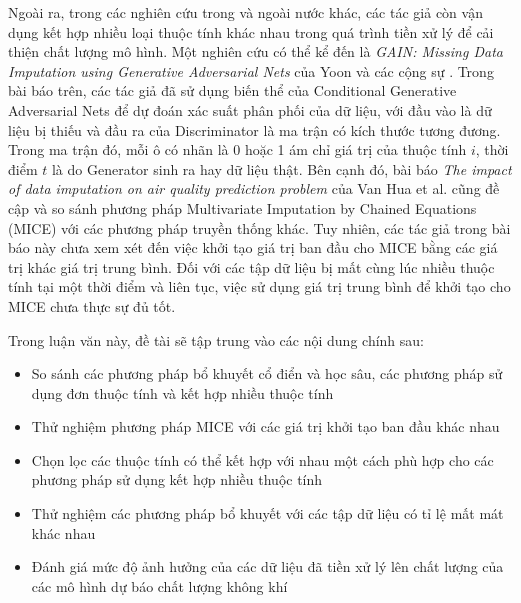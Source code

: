 Ngoài ra, trong các nghiên cứu trong và ngoài nước khác, các tác giả còn vận dụng kết hợp nhiều loại thuộc tính khác nhau trong quá trình tiền xử lý để cải thiện chất lượng mô hình. Một nghiên cứu có thể kể đến là \textit{GAIN: Missing Data Imputation using Generative Adversarial Nets
} của Yoon và các cộng sự \cite{pmlr-v80-yoon18a}. Trong bài báo trên, các tác giả đã sử dụng biến thể của Conditional Generative Adversarial Nets để dự đoán xác suất phân phối của dữ liệu, với đầu vào là dữ liệu bị thiếu và đầu ra của Discriminator là ma trận có kích thước tương đương. Trong ma trận đó, mỗi ô có nhãn là 0 hoặc 1 ám chỉ giá trị của thuộc tính $i$, thời điểm $t$ là do Generator sinh ra hay dữ liệu thật. Bên cạnh đó, bài báo \textit{The impact of data imputation on air quality prediction problem} của Van Hua et al. \cite{article-vanhua} cũng đề cập và so sánh phương pháp Multivariate Imputation by Chained Equations (MICE) với các phương pháp truyền thống khác. Tuy nhiên, các tác giả trong bài báo này chưa xem xét đến việc khởi tạo giá trị ban đầu cho MICE bằng các giá trị khác giá trị trung bình. Đối với các tập dữ liệu bị mất cùng lúc nhiều thuộc tính tại một thời điểm và liên tục, việc sử dụng giá trị trung bình để khởi tạo cho MICE chưa thực sự đủ tốt.

Trong luận văn này, đề tài sẽ tập trung vào các nội dung chính sau:
\begin{itemize}
    \item So sánh các phương pháp bổ khuyết cổ điển và học sâu, các phương pháp sử dụng đơn thuộc tính và kết hợp nhiều thuộc tính
    \item Thử nghiệm phương pháp MICE với các giá trị khởi tạo ban đầu khác nhau
    \item Chọn lọc các thuộc tính có thể kết hợp với nhau một cách phù hợp cho các phương pháp sử dụng kết hợp nhiều thuộc tính
    \item Thử nghiệm các phương pháp bổ khuyết với các tập dữ liệu có tỉ lệ mất mát khác nhau
    \item Đánh giá mức độ ảnh hưởng của các dữ liệu đã tiền xử lý lên chất lượng của các mô hình dự báo chất lượng không khí
\end{itemize}